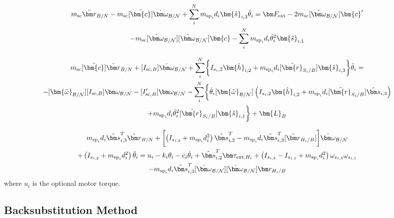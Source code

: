 \begin{multline}
m_{\text{sc}} \ddot{\bm r}_{B/N}-m_{\text{sc}} [\tilde{\bm{c}}]\dot{\bm\omega}_{\cal B/N}+\sum_{i}^{N}m_{\text{sp}_i} d_i  \bm{\hat{s}}_{i,3}\ddot{\theta}_i = \bm F_{\textnormal{ext}} - 2 m_{\text{sc}} [\tilde{\bm\omega}_{\cal B/N}]\bm{c}'\\
-m_{\text{sc}} [\tilde{\bm\omega}_{\cal B/N}][\tilde{\bm\omega}_{\cal B/N}]\bm{c}-\sum_{i}^{N}m_{\text{sp}_i}d_i\dot{\theta}_i^2 \bm{\hat{s}}_{i,1}
\label{eq:Rbddot3}
\end{multline}

\begin{multline}
	m_{\text{sc}}[\tilde{\bm{c}}]\ddot{\bm r}_{B/N}+[I_{\text{sc},B}] \dot{\bm\omega}_{\cal B/N} +\sum\limits_{i}^{N}\biggl\lbrace I_{s_i,2}\bm{\hat{h}}_{i,2}+m_{\text{sp}_i}d_i [\tilde{\bm{r}}_{S_i/B}] \bm{\hat{s}}_{i,3}\biggr\rbrace\ddot{\theta}_i = \\
	-[\bm{\tilde{\omega}}_{\cal B/N}] [I_{\text{sc},B}] \bm\omega_{\cal B/N}
	- [I'_{\text{sc},B}] \bm\omega_{\cal B/N} - \sum\limits_{i}^{N}\biggl\lbrace\dot{\theta}_i [\bm{\tilde{\omega}}_{\cal B/N}] \left(I_{s_i,2} \bm{\hat{h}}_{i,2}+m_{\text{sp}_i} d_i [\tilde{\bm{r}}_{S_i/B}] \hat{\bm s}_{i,3}\right)\\ +m_{\text{sp}_i}d_i\dot{\theta}_i^2[\tilde{\bm{r}}_{S_i/B}] \bm{\hat{s}}_{i,1} \biggr\rbrace + \bm{L}_B
	\label{eq:Final6}
\end{multline}

\begin{multline}
m_{\text{sp}_i} d_i \hat{\bm s}_{i,3}^{T} \ddot{\bm r}_{B/N}+ \biggl[\left(I_{s_{i,2}} + m_{\text{sp}_i}d_i^{2}\right) \hat{\bm s}_{i,2}^{T}-m_{\text{sp}_i} d_i \hat{\bm s}_{i,3}^{T} [\tilde{\bm r}_{H_i/B}]\biggr] \dot{\bm\omega}_{\cal B/N} \\
+ \left( I_{s_{i,2}} + m_{\text{sp}_i} d_i^{2} \right) \ddot \theta_i
= u_i - k_i \theta_i - c_i \dot\theta_i + \hat{\bm s}_{i,2}^T \bm \tau_{\text{ext},H_i} + \left( I_{s_{i,3}} - I_{s_{i,1}} + m_{\text{sp}_i}d_i^{2}\right) \omega_{s_{i,3}} \omega_{s_{i,1}}\\
- m_{\text{sp}_i} d_i \hat{\bm s}_{i,3}^{T} [\tilde{\bm\omega}_{\cal B/N}][\tilde{\bm\omega}_{\cal B/N}] \bm r_{H_i/B}
\label{eq:solar_panel_final3}
\end{multline}
where $u_i$ is the optional motor torque.

\subsection{Backsubstitution Method}

